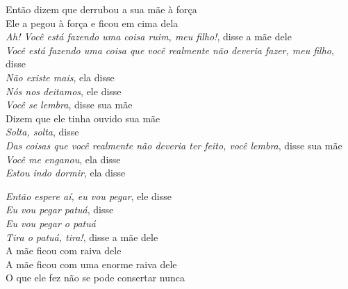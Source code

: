 \noindent Então dizem que derrubou a sua mãe à força\\
Ele a pegou à força e ficou em cima dela\\
\textit{Ah! Você está fazendo uma coisa ruim, meu filho!}, disse a mãe dele\\
\textit{Você está fazendo uma coisa que você realmente não deveria fazer, meu filho}, disse\\
\textit{Não existe mais}, ela disse\\
\textit{Nós nos deitamos}, ele disse\\
\textit{Você se lembra}, disse sua mãe\\
Dizem que ele tinha ouvido sua mãe\\
\textit{Solta, solta}, disse\\
\textit{Das coisas que você realmente não deveria ter feito, você lembra}, disse sua mãe\\
\textit{Você me enganou}, ela disse\\
\textit{Estou indo dormir}, ela disse

\smallskip
\begin{center}\end{center}
\smallskip

\noindent \textit{Então espere aí, eu vou pegar}, ele disse\\
\textit{Eu vou pegar patuá}, disse\\
\textit{Eu vou pegar o patuá}\\
\textit{Tira o patuá, tira!}, disse a mãe dele\\
A mãe ficou com raiva dele\\
A mãe ficou com uma enorme raiva dele\\
O que ele fez não se pode consertar nunca

